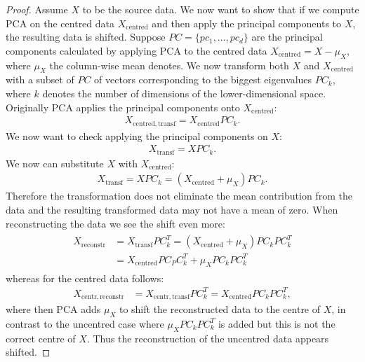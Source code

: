 \documentclass[pdftex,12pt,a4paper]{report}
\begin{document}
\begin{proof}
    Assume $X$ to be the source data.
    We now want to show that if we compute PCA on the centred data $X_\mathrm{centred}$ and then apply the principal components to $X$, the resulting data is shifted.
    Suppose $PC = \{pc_1, \dots, pc_d\}$ are the principal components calculated by applying PCA to the centred data $X_\mathrm{centred} = X - \mu_X$, where $\mu_X$ the column-wise mean denotes.
    We now transform both $X$ and  $X_\mathrm{centred}$ with a subset of $PC$ of vectors corresponding to the biggest eigenvalues $PC_k$, where $k$ denotes the number of dimensions of the lower-dimensional space.
    Originally PCA applies the principal components onto $X_\mathrm{centred}$:
    \begin{align*}
        X_{\mathrm{centred, transf}} = X_\mathrm{centred} PC_k.
    \end{align*}
    We now want to check applying the principal components on $X$:
    \begin{align*}
        X_{\mathrm{transf}} = X PC_k.
    \end{align*}
    We now can substitute $X$ with $X_\mathrm{centred}$:
    \begin{align*}
    X_\mathrm{transf} = X PC_k = (X_\mathrm{centred} + \mu_X) PC_k.
    \end{align*}
    Therefore the transformation does not eliminate the mean contribution from the data and the resulting transformed data may not have a mean of zero.
    When reconstructing the data we see the shift even more:
    \begin{align*}
        \begin{split}
            X_\mathrm{reconstr} & = X_\mathrm{transf} PC_k^T = (X_\mathrm{centred} + \mu_X) PC_k PC_k^T \\ & =  X_\mathrm{centred} PC_ PC_k^T + \mu_X PC_k PC_k^T
        \end{split}
    \end{align*}
    whereas for the centred data follows:
    \begin{equation*}
        \begin{split}
            X_{\mathrm{centr, reconstr}} & = X_{\mathrm{centr, transf}} PC_k^T = X_\mathrm{centred} PC_k PC_k^T,
        \end{split}
    \end{equation*}
    where then PCA adds $\mu_X$ to shift the reconstructed data to the centre of $X$, in contrast to the uncentred case where $\mu_X P C_k P C_k^T$ is added but this is not the correct centre of $X$.
    Thus the reconstruction of the uncentred data appears shifted.
\end{proof}
\end{document}
